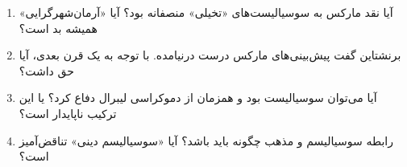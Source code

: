 \vspace{20pt}

\begin{questionbox}

\begin{enumerate}[nosep, rightmargin=1cm]
    \item آیا نقد مارکس به سوسیالیست‌های «تخیلی» منصفانه بود؟ آیا «آرمان‌شهرگرایی» همیشه بد است؟

    \item برنشتاین گفت پیش‌بینی‌های مارکس درست درنیامده. با توجه به یک قرن بعدی، آیا حق داشت؟

    \item آیا می‌توان سوسیالیست بود و همزمان از دموکراسی لیبرال دفاع کرد؟ یا این ترکیب ناپایدار است؟

    \item رابطه سوسیالیسم و مذهب چگونه باید باشد؟ آیا «سوسیالیسم دینی» تناقض‌آمیز است؟
\end{enumerate}

\end{questionbox}

